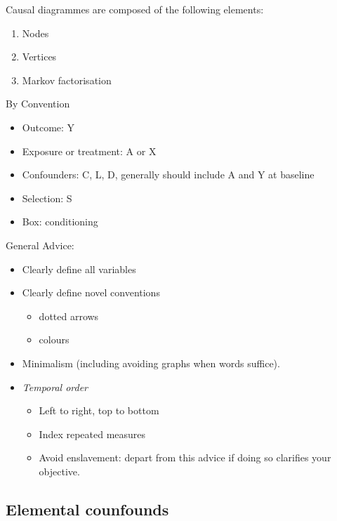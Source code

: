 \documentclass[
  singlecolumn]{report}
\providecommand{\tightlist}{%
  \setlength{\itemsep}{0pt}\setlength{\parskip}{0pt}}\usepackage{longtable,booktabs,array}
\begin{document}
Causal diagrammes are composed of the following elements:

\begin{enumerate}
\def\labelenumi{\arabic{enumi}.}
\tightlist
\item
  Nodes
\item
  Vertices
\item
  Markov factorisation
\end{enumerate}

By Convention

\begin{itemize}
\tightlist
\item
  Outcome: Y
\item
  Exposure or treatment: A or X
\item
  Confounders: C, L, D, generally should include A and Y at baseline
\item
  Selection: S
\item
  Box: conditioning
\end{itemize}

General Advice:

\begin{itemize}
\tightlist
\item
  Clearly define all variables
\item
  Clearly define novel conventions

  \begin{itemize}
  \tightlist
  \item
    dotted arrows
  \item
    colours
  \end{itemize}
\item
  Minimalism (including avoiding graphs when words suffice).
\item
  \emph{Temporal order}

  \begin{itemize}
  \tightlist
  \item
    Left to right, top to bottom
  \item
    Index repeated measures
  \item
    Avoid enslavement: depart from this advice if doing so clarifies
    your objective.
  \end{itemize}
\end{itemize}

\hypertarget{elemental-counfounds}{%
\subsection{Elemental counfounds}\label{elemental-counfounds}}
\end{document}
